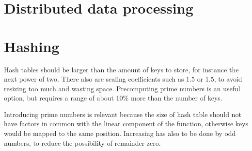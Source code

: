 \section{Distributed data processing}


\section{Hashing}
Hash tables should be larger than the amount of keys to store, for instance the next power of two. There also are scaling coefficients such as 1.5 or 1.5, to avoid resizing too much and wasting space. Precomputing prime numbers is an useful option, but requires a range of about 10\% more than the number of keys. 


Introducing prime numbers is relevant because the size of hash table should not have factors in common with the linear component of the function, otherwise keys would be mapped to the same position. Increasing has also to be done by odd numbers, to reduce the possibility of remainder zero.